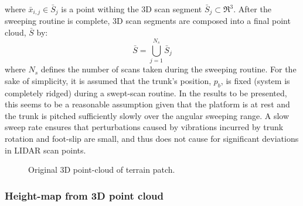 				where $\bar{x}_{i,j} \in \bar{S}_{j}$ is a point withing the 3D \Jth scan segment $\bar{S}_{j} \subset \Re^{3}$. After the sweeping routine is complete, 3D scan segments are composed into a final point cloud, $\bar{S}$ by:
				\begin{equation}
					\bar{S} = \bigcup_{j=1}^{N_{s}} \bar{S}_{j}
				\end{equation}
				where $N_{s}$ defines the number of scans taken during the sweeping routine.
				For the sake of simplicity, it is assumed that the trunk's position, $p_{b}$, is fixed (system is completely ridged) during a swept-scan routine. In the results to be presented, this seems to be a reasonable assumption given that the platform is at rest and the trunk is pitched sufficiently slowly over the angular sweeping range. A slow sweep rate ensures that perturbations caused by vibrations incurred by trunk rotation and foot-slip are small, and thus does not cause for significant deviations in LIDAR scan points.
					\begin{figure}[h!]
						\centering
						\caption{Original 3D point-cloud of terrain patch.}
						\label{fig::pointcloud_terrain_patch}
					\end{figure}


			\subsubsection{Height-map from 3D point cloud}
				
